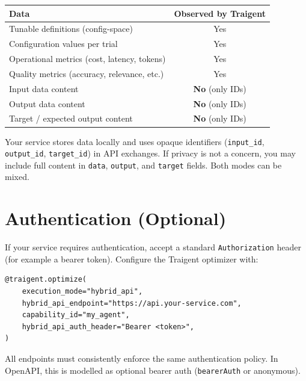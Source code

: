 \documentclass[11pt,a4paper]{article}
\newcommand{\field}[1]{\texttt{#1}}
\begin{document}
\begin{center}
\small
\begin{tabular}{@{}lc@{}}
\toprule
\textbf{Data} & \textbf{Observed by Traigent} \\
\midrule
Tunable definitions (config-space)             & Yes \\
Configuration values per trial                 & Yes \\
Operational metrics (cost, latency, tokens)    & Yes \\
Quality metrics (accuracy, relevance, etc.)    & Yes \\
Input data content                             & \textcolor{privacygreen}{\textbf{No}} (only IDs) \\
Output data content                            & \textcolor{privacygreen}{\textbf{No}} (only IDs) \\
Target / expected output content               & \textcolor{privacygreen}{\textbf{No}} (only IDs) \\
\bottomrule
\end{tabular}
\end{center}

Your service stores data locally and uses opaque identifiers
(\field{input\_id}, \field{output\_id}, \field{target\_id}) in API exchanges.
If privacy is not a concern, you may include full content in \field{data},
\field{output}, and \field{target} fields. Both modes can be mixed.

\section{Authentication (Optional)}

If your service requires authentication, accept a standard
\texttt{Authorization} header (for example a bearer token). Configure the
Traigent optimizer with:

\begin{lstlisting}[basicstyle=\ttfamily\small]
@traigent.optimize(
    execution_mode="hybrid_api",
    hybrid_api_endpoint="https://api.your-service.com",
    capability_id="my_agent",
    hybrid_api_auth_header="Bearer <token>",
)
\end{lstlisting}

All endpoints must consistently enforce the same authentication policy.
In OpenAPI, this is modelled as optional bearer auth (\texttt{bearerAuth} or anonymous).
\end{document}
